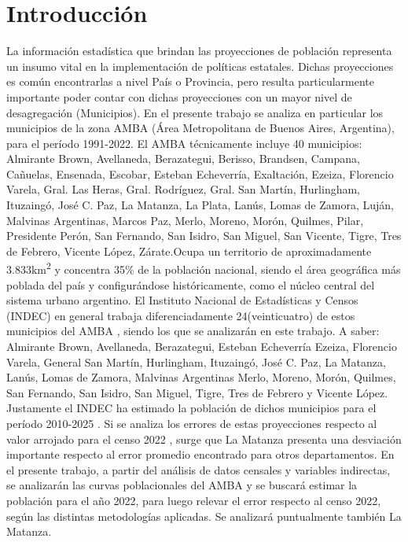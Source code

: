 \documentclass{article}
\theoremstyle{mytheoremstyle}
\theoremstyle{mytheoremstyle}
\theoremstyle{myproblemstyle}
\begin{document}
\section{Introducción}
La información estadística que brindan las proyecciones de población representa un insumo vital en la implementación de 
políticas estatales. Dichas proyecciones es común encontrarlas a nivel País o Provincia, 
pero resulta particularmente importante poder contar con dichas proyecciones con un mayor nivel de desagregación (Municipios).
En el presente trabajo se analiza en particular los municipios de la zona AMBA (Área Metropolitana de Buenos Aires, Argentina),
 para el período 1991-2022. El AMBA técnicamente incluye 40 municipios: Almirante Brown, Avellaneda, Berazategui, Berisso, 
 Brandsen, Campana, Cañuelas, Ensenada, Escobar, Esteban Echeverría, Exaltación, Ezeiza, 
 Florencio Varela, Gral. Las Heras, Gral. Rodríguez, Gral. San Martín, Hurlingham, Ituzaingó, José C. Paz, 
 La Matanza, La Plata, Lanús, Lomas de Zamora, Luján, Malvinas Argentinas, Marcos Paz, Merlo, Moreno, Morón, 
 Quilmes, Pilar, Presidente Perón, San Fernando, San Isidro, San Miguel, San Vicente, Tigre, Tres de Febrero, 
 Vicente López, Zárate.Ocupa un territorio de aproximadamente 3.833\textup{km\textsuperscript{2}} y concentra 35\% de la población nacional, 
 siendo el área geográfica más poblada del país y configurándose históricamente, 
 como el núcleo central del sistema urbano argentino.\newline\newline
 El Instituto Nacional de Estadísticas y Censos (INDEC) en general trabaja diferenciadamente 24(veinticuatro) de estos municipios del AMBA ,
 siendo los que se analizarán en este trabajo. A saber: Almirante Brown, Avellaneda, Berazategui, Esteban Echeverría
 Ezeiza, Florencio Varela, General San Martín, Hurlingham, Ituzaingó, José C. Paz, La Matanza, Lanús, Lomas de Zamora, Malvinas Argentinas
 Merlo, Moreno, Morón, Quilmes, San Fernando, San Isidro, San Miguel, Tigre, Tres de Febrero y Vicente López.\newline\newline
 Justamente el INDEC ha estimado la población de dichos municipios para el período 2010-2025 .
 Si se analiza los errores de estas proyecciones respecto al valor arrojado para el censo 2022  , surge 
 que La Matanza presenta una desviación importante respecto
al error promedio encontrado para otros departamentos.\newline\newline 
En el presente trabajo, a partir del análisis de datos censales y variables indirectas, se analizarán las curvas poblacionales del AMBA y
 se buscará estimar la población para el año 2022, para luego relevar el error respecto al censo 2022, según 
 las distintas metodologías aplicadas. Se analizará puntualmente también La Matanza.
\end{document}
